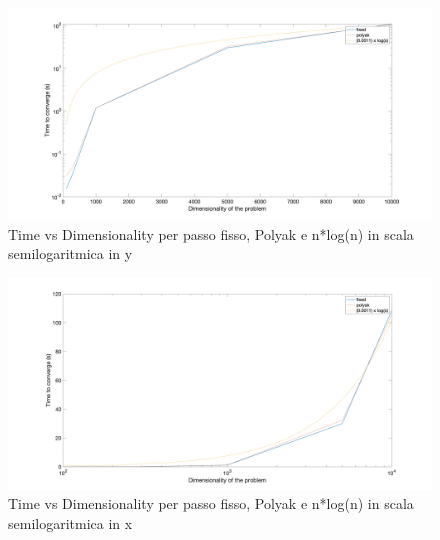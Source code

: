 \begin{figure}[H]
\centering
    \includegraphics[width=20cm, center]{./plots/time_dimensionality_log_expected.png}
    \caption{Time vs Dimensionality per passo fisso, Polyak e n*log(n) in scala semilogaritmica in y}
    \label{fig:high_dim2}
\end{figure}

\begin{figure}[H]
\centering
    \includegraphics[width=20cm, center]{./plots/time_dimensionality_logx_expected.png}
    \caption{Time vs Dimensionality per passo fisso, Polyak e n*log(n) in scala semilogaritmica in x}
    \label{fig:high_dim3}
\end{figure}
